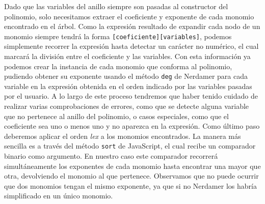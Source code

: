 Dado que las variables del anillo siempre son pasadas al constructor del polinomio, solo necesitamos extraer el coeficiente y exponente de cada monomio encontrado en el árbol. Como la expresión resultado de expandir cada nodo de un monomio siempre tendrá la forma \texttt{[coeficiente][variables]}, podemos simplemente recorrer la expresión hasta detectar un carácter no numérico, el cual marcará la división entre el coeficiente y las variables. Con esta información ya podemos crear la instancia de cada monomio que conforma al polinomio, pudiendo obtener su exponente usando el método \texttt{deg} de Nerdamer para cada variable en la expresión obtenida en el orden indicado por las variables pasadas por el usuario. A lo largo de este proceso tendremos que haber tenido cuidado de realizar varias comprobaciones de errores, como que se detecte alguna variable que no pertenece al anillo del polinomio, o casos especiales, como que el coeficiente sea uno o menos uno y no aparezca en la expresión. Como último paso deberemos aplicar el orden \textit{lex} a los monomios encontrados. La manera más sencilla es a través del método \texttt{sort} de JavaScript, el cual recibe un comparador binario como argumento. En nuestro caso este comparador recorrerá simultáneamente los exponentes de cada monomio hasta encontrar una mayor que otra, devolviendo el monomio al que pertenece. Observamos que no puede ocurrir que dos monomios tengan el mismo exponente, ya que si no Nerdamer los habría simplificado en un único monomio.\\

